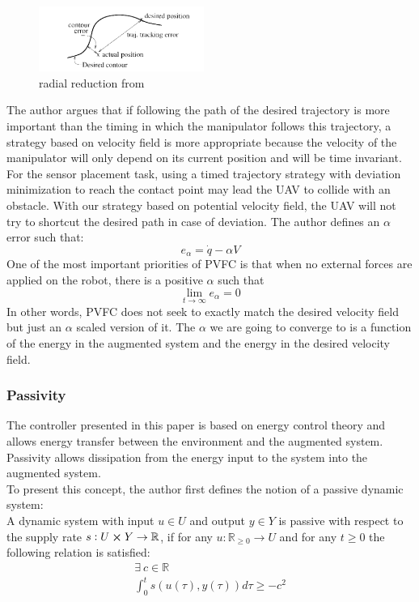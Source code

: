 \begin{figure}[h!]
    \centering
    \includegraphics[width=0.48\textwidth]{Images/radialreduction.png}
    \caption{radial reduction from \cite{li1999passive}}
    \label{fig:radialreduction}
\end{figure} 
The author argues that if following the path of the desired trajectory is more important than the timing in which the manipulator follows this trajectory, a strategy based on velocity field is more appropriate because the velocity of the manipulator will only depend on its current position and will be time invariant.  
For the sensor placement task, using a timed trajectory strategy with deviation minimization to reach the contact point may lead the UAV to collide with an obstacle. With our strategy based on potential velocity field, the UAV will not try to shortcut the desired path in case of deviation.
The author defines an $\alpha$ error such that:
\begin{equation}
    e_{\alpha} = \dot{q} - \alpha V \label{alphaerror}
\end{equation}
One of the most important priorities of PVFC is that when no external forces are applied on the robot, there is a positive $\alpha$ such that 
\begin{equation}
    \lim_{t\to\infty}e_{\alpha} = 0
\end{equation}
In other words, PVFC does not seek to exactly match the desired velocity field but just an $\alpha$ scaled version of it. The $\alpha$ we are going to converge to is a function of the energy in the augmented system and the energy in the desired velocity field.
\subsubsection{Passivity}
The controller presented in this paper is based on energy control theory and allows energy transfer between the environment and the augmented system.
Passivity allows dissipation from the energy input to the system into the augmented system. \\
To present this concept, the author first defines the notion of a passive dynamic system:\\
A dynamic system with input $u \in U$ and output $y \in Y$ is passive with respect to the supply rate 
$s:U \cross Y \rightarrow \mathbb R$, if for any $u: \mathbb R_{\ge 0} \rightarrow U $ and for any $t\geq 0$ the following relation is satisfied:
\begin{align}
    \exists ~ c\in\mathbb R  \nonumber\\
    \int_{0}^{t}s(u(\tau),y(\tau))d\tau \geq -c^2 \label{passivityCondition}
\end{align}

